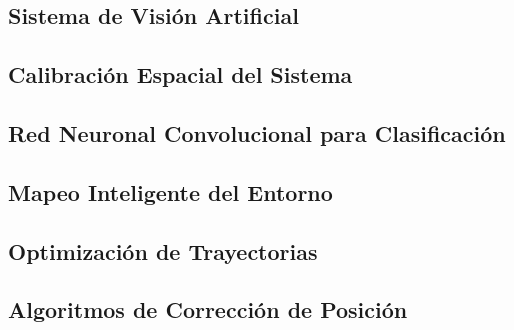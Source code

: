 \documentclass[a4paper,12pt]{report}
\begin{document}
\subsection{Sistema de Visión Artificial}




\subsection{Calibración Espacial del Sistema}




\subsection{Red Neuronal Convolucional para Clasificación}





\subsection{Mapeo Inteligente del Entorno}





\subsection{Optimización de Trayectorias}




\subsection{Algoritmos de Corrección de Posición}



\end{document}
